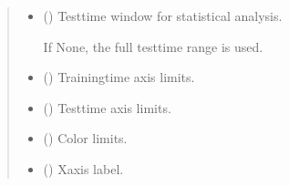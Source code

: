 \documentclass[letterpaper,10pt,english]{sphinxhowto}
\begin{document}
\begin{fulllineitems}
\begin{quote}
\begin{description}
\begin{itemize}
\sphinxAtStartPar
If None, the full training\sphinxhyphen{}time range is used.


\item {} 
\sphinxAtStartPar
{} (\sphinxstyleliteralemphasis{\sphinxupquote{, }}) \textendash{} 
\sphinxAtStartPar
Test\sphinxhyphen{}time window for statistical analysis.

\sphinxAtStartPar
If None, the full test\sphinxhyphen{}time range is used.


\item {} 
\sphinxAtStartPar
{} (\sphinxstyleliteralemphasis{\sphinxupquote{, }}) \textendash{} Training\sphinxhyphen{}time axis limits.

\item {} 
\sphinxAtStartPar
{} (\sphinxstyleliteralemphasis{\sphinxupquote{, }}) \textendash{} Test\sphinxhyphen{}time axis limits.

\item {} 
\sphinxAtStartPar
{} (\sphinxstyleliteralemphasis{\sphinxupquote{, }}\sphinxstyleliteralemphasis{\sphinxupquote{(}}\sphinxstyleliteralemphasis{\sphinxupquote{, }}\sphinxstyleliteralemphasis{\sphinxupquote{)}}) \textendash{} Color limits.

\item {} 
\sphinxAtStartPar
{} (\sphinxstyleliteralemphasis{\sphinxupquote{, }}\sphinxstyleliteralemphasis{\sphinxupquote{ (}}\sphinxstyleliteralemphasis{\sphinxupquote{)}}) \textendash{} X\sphinxhyphen{}axis label.


\end{itemize}
\end{description}
\end{quote}
\end{fulllineitems}
\end{document}
